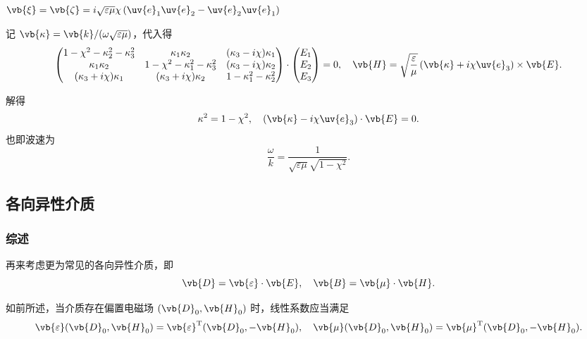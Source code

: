 \begin{example}
	\(\vb{\xi}=\vb{\zeta}=i\sqrt{\varepsilon\mu}\chi\left(\uv{e}_1\uv{e}_2 - \uv{e}_2\uv{e}_1\right)\)

	记 \(\vb{\kappa}=\vb{k}/(\omega\sqrt{\varepsilon\mu})\)，代入得
	\begin{equation*}
		\begin{pmatrix}
			1-\chi^2-\kappa_2^2-\kappa_3^2 & \kappa_1\kappa_2               & (\kappa_3-i\chi)\kappa_1 \\
			\kappa_1\kappa_2               & 1-\chi^2-\kappa_1^2-\kappa_3^2 & (\kappa_3-i\chi)\kappa_2 \\
			(\kappa_3+i\chi)\kappa_1       & (\kappa_3+i\chi)\kappa_2       & 1-\kappa_1^2-\kappa_2^2
		\end{pmatrix}\cdot\begin{pmatrix}E_1 \\ E_2 \\ E_3\end{pmatrix}=0,\quad
		\vb{H} = \sqrt{\frac{\varepsilon}{\mu}}\left(\vb{\kappa} + i\chi\uv{e}_3\right)\times\vb{E}.
	\end{equation*}

	解得
	\begin{equation*}
		\kappa^2=1-\chi^2,\quad \left(\vb{\kappa}-i\chi\uv{e}_3\right)\cdot\vb{E}=0.
	\end{equation*}
	也即波速为
	\begin{equation*}
		\frac{\omega}{k} = \frac{1}{\sqrt{\varepsilon\mu}\sqrt{1-\chi^2}}.
	\end{equation*}
\end{example}

\subsection{各向异性介质}
\subsubsection{综述}

再来考虑更为常见的各向异性介质，即
\begin{equation*}
	\vb{D}=\vb{\varepsilon}\cdot\vb{E},\quad \vb{B}=\vb{\mu}\cdot\vb{H}.
\end{equation*}

如前所述，当介质存在偏置电磁场 \((\vb{D}_0, \vb{H}_0)\) 时，线性系数应当满足
\begin{equation*}
	\vb{\varepsilon}(\vb{D}_0, \vb{H}_0) = \vb{\varepsilon}^\mathrm{T}(\vb{D}_0, -\vb{H}_0),\quad
	\vb{\mu}(\vb{D}_0, \vb{H}_0) = \vb{\mu}^\mathrm{T}(\vb{D}_0, -\vb{H}_0).
\end{equation*}

